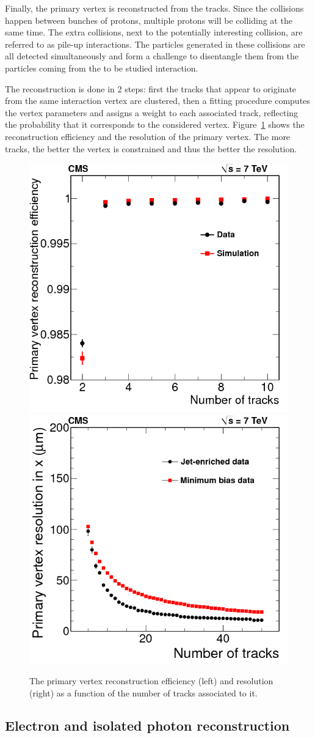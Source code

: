Finally, the primary vertex is reconstructed from the tracks. Since the collisions happen between bunches of protons, multiple protons will be colliding at the same time. The extra collisions, next to the potentially interesting collision, are referred to as pile-up interactions. The particles generated in these collisions are all detected simultaneously and form a challenge to disentangle them from the particles coming from the to be studied interaction.

The reconstruction is done in 2 steps: first the tracks that appear to originate from the same interaction vertex are clustered, then a fitting procedure computes the vertex parameters and assigns a weight to each associated track, reflecting the probability that it corresponds to the considered vertex. Figure~\ref{fig:PV} shows the reconstruction efficiency and the resolution of the primary vertex. The more tracks, the better the vertex is constrained and thus the better the resolution.

\begin{figure}[ht]
  \centering
\includegraphics[width=.4\textwidth]{PV_eff}\hspace{1cm}
 \includegraphics[width=.4\textwidth]{PV_res} 
 \caption{The primary vertex reconstruction efficiency (left) and resolution (right) as a function of the number of tracks associated to it.~\cite{Chatrchyan:2014fea}}
 \label{fig:PV}
\end{figure}

\subsection{Electron and isolated photon reconstruction}
\label{sec:electron_reconstruction}

